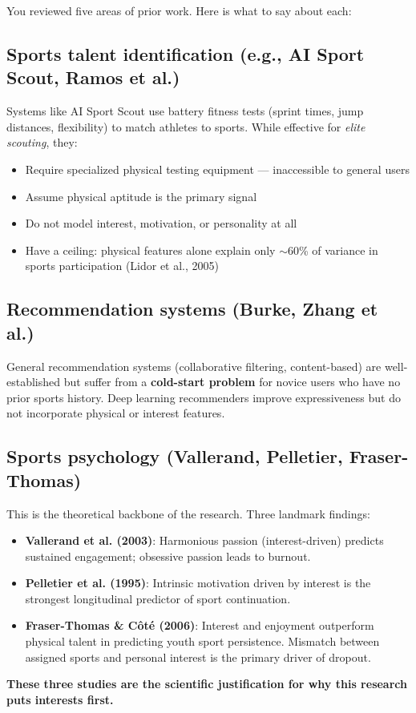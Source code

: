 \documentclass[12pt,a4paper]{article}
\begin{document}
You reviewed five areas of prior work. Here is what to say about each:

\subsection{Sports talent identification (e.g., AI Sport Scout, Ramos et al.)}

Systems like AI Sport Scout use battery fitness tests (sprint times, jump
distances, flexibility) to match athletes to sports. While effective for
\emph{elite scouting}, they:
\begin{itemize}
\item Require specialized physical testing equipment --- inaccessible to
general users
\item Assume physical aptitude is the primary signal
\item Do not model interest, motivation, or personality at all
\item Have a ceiling: physical features alone explain only $\sim$60\% of
variance in sports participation (Lidor et al., 2005)
\end{itemize}

\subsection{Recommendation systems (Burke, Zhang et al.)}

\begin{sloppypar}
General recommendation systems (collaborative filtering, content-based) are
well-established but suffer from a \textbf{cold-start problem} for novice
users who have no prior sports history. Deep learning recommenders improve
expressiveness but do not incorporate physical or interest features.
\end{sloppypar}

\subsection{Sports psychology (Vallerand, Pelletier, Fraser-Thomas)}

This is the theoretical backbone of the research. Three landmark findings:
\begin{itemize}
\item \textbf{Vallerand et al. (2003)}: Harmonious passion (interest-driven)
predicts sustained engagement; obsessive passion leads to burnout.
\item \textbf{Pelletier et al. (1995)}: Intrinsic motivation driven by
interest is the strongest longitudinal predictor of sport continuation.
\item \textbf{Fraser-Thomas \& C\^{o}t\'{e} (2006)}: Interest and enjoyment
outperform physical talent in predicting youth sport persistence. Mismatch
between assigned sports and personal interest is the primary driver of dropout.
\end{itemize}
\textbf{These three studies are the scientific justification for why this
research puts interests first.}
\end{document}
